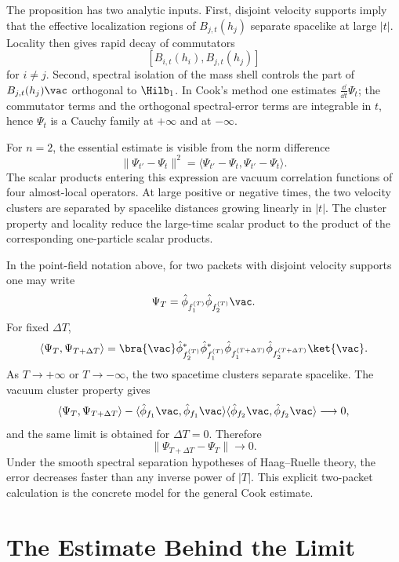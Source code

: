 The proposition has two analytic inputs. First, disjoint velocity supports imply
that the effective localization regions of \(B_{j,t}(h_j)\) separate
spacelike at large \(|t|\). Locality then gives rapid decay of commutators
\[
  [B_{i,t}(h_i),B_{j,t}(h_j)]
\]
for \(i\ne j\). Second, spectral isolation of the mass shell controls the part
of \(B_{j,t}(h_j)\vac\) orthogonal to \(\Hilb_1\). In Cook's method one
estimates \(\frac{\dd}{\dd t}\Psi_t\); the commutator terms and the
orthogonal spectral-error terms are integrable in \(t\), hence
\(\Psi_t\) is a Cauchy family at \(+\infty\) and at \(-\infty\).

For \(n=2\), the essential estimate is visible from the norm difference
\[
  \|\Psi_{t'}-\Psi_t\|^2
  =
  \langle\Psi_{t'}-\Psi_t,\Psi_{t'}-\Psi_t\rangle .
\]
The scalar products entering this expression are vacuum correlation functions
of four almost-local operators. At large positive or negative times, the two
velocity clusters are separated by spacelike distances growing linearly in
\(|t|\). The cluster property and locality reduce the large-time scalar
product to the product of the corresponding one-particle scalar products.

In the point-field notation above, for two packets with disjoint velocity
supports one may write
\[
  \Psi_T=\hat\phi_{f_1^{(T)}}\hat\phi_{f_2^{(T)}}\vac .
\]
For fixed \(\Delta T\),
\[
\begin{aligned}
  \langle\Psi_T,\Psi_{T+\Delta T}\rangle
  =
  \bra{\vac}
  \hat\phi_{f_2^{(T)}}^*
  \hat\phi_{f_1^{(T)}}^*
  \hat\phi_{f_1^{(T+\Delta T)}}
  \hat\phi_{f_2^{(T+\Delta T)}}
  \ket{\vac} .
\end{aligned}
\]
As \(T\to+\infty\) or \(T\to-\infty\), the two spacetime clusters separate
spacelike.  The vacuum cluster property gives
\[
  \langle\Psi_T,\Psi_{T+\Delta T}\rangle
  -
  \langle\hat\phi_{f_1}\vac,\hat\phi_{f_1}\vac\rangle
  \langle\hat\phi_{f_2}\vac,\hat\phi_{f_2}\vac\rangle
  \longrightarrow 0,
\]
and the same limit is obtained for \(\Delta T=0\).  Therefore
\[
  \|\Psi_{T+\Delta T}-\Psi_T\|\longrightarrow0 .
\]
Under the smooth spectral separation hypotheses of Haag--Ruelle theory, the
error decreases faster than any inverse power of \(|T|\).  This explicit
two-packet calculation is the concrete model for the general Cook estimate.

\section{The Estimate Behind the Limit}

